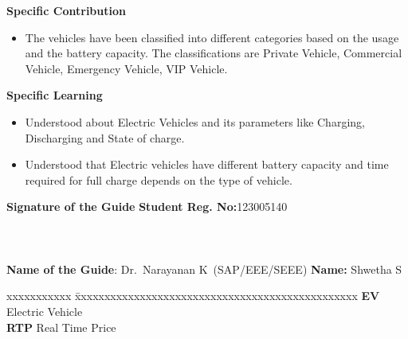 \documentclass[a4paper, 12pt, oneside]{sastra}
\begin{document}
	\noindent \textbf{Specific Contribution}
	\begin{itemize}
		\item The vehicles have been classified into different categories based on the usage and the battery capacity. The classifications are Private Vehicle, Commercial Vehicle, Emergency Vehicle, VIP Vehicle.

	\end{itemize}
	\noindent \textbf{Specific Learning}
	\begin{itemize}
		\item Understood about Electric Vehicles and its parameters like Charging, Discharging and State of charge.
		\item Understood that Electric vehicles have different battery capacity and time required for full charge depends on the type of vehicle.
	\end{itemize}
	
	\vspace*{24pt}
	
	\noindent \textbf{Signature of the Guide} \hspace*{66mm} \textbf{Student Reg. No:}123005140\\
		\\
	\\
	\\
\noindent \textbf{Name of the Guide}:{ Dr.~Narayanan K}~(SAP/EEE/SEEE) \hspace*{15 mm} \textbf{Name:} Shwetha S
\pagebreak
	
	
	
	\begin{singlespace}
		\tableofcontents
		\thispagestyle{empty}
		
		
		\listoffigures
		\listoftables
	\end{singlespace}
	
	
	\abbreviations
	
	\noindent 
	\begin{tabbing}
		xxxxxxxxxxx \= xxxxxxxxxxxxxxxxxxxxxxxxxxxxxxxxxxxxxxxxxxxxxxxx \kill
		\textbf{EV}   \> Electric Vehicle \\
		\textbf{RTP} \> Real Time Price \\
	\end{tabbing}
	
	\pagebreak
	
\end{document}
